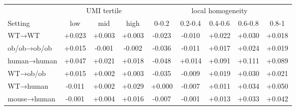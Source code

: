 \begin{tabular}{lccc|ccccc}
\toprule
 & \multicolumn{3}{c|}{UMI tertile} & \multicolumn{5}{c}{local homogeneity} \\
Setting & low & mid & high & 0-0.2 & 0.2-0.4 & 0.4-0.6 & 0.6-0.8 & 0.8-1 \\
\midrule
WT→WT & +0.023 & +0.003 & +0.003 & -0.023 & -0.010 & +0.022 & +0.030 & +0.018 \\
ob/ob→ob/ob & +0.015 & -0.001 & -0.002 & -0.036 & -0.011 & +0.017 & +0.024 & +0.019 \\
human→human & +0.047 & +0.021 & +0.018 & -0.048 & +0.014 & +0.091 & +0.111 & +0.089 \\
WT→ob/ob & +0.015 & +0.002 & +0.003 & -0.035 & -0.009 & +0.019 & +0.030 & +0.021 \\
WT→human & -0.011 & +0.002 & +0.029 & +0.000 & -0.007 & +0.011 & +0.034 & +0.050 \\
mouse→human & -0.001 & +0.004 & +0.016 & -0.007 & -0.001 & +0.013 & +0.033 & +0.042 \\
\bottomrule
\end{tabular}
